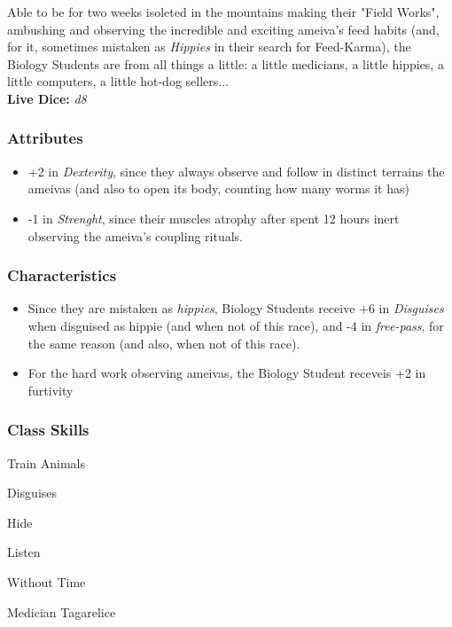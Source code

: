 \documentclass[ letterpaper,12pt]{article}
\begin{document}
Able to be for two weeks isoleted in the mountains making their "Field Works",
ambushing and observing the incredible and exciting ameiva's feed habits (and,
for it, sometimes mistaken as {\it Hippies} in their search for Feed-Karma),
the Biology Students are from all things a little: a little medicians, a little
hippies, a little computers, a little hot-dog sellers...\\

{\bf Live Dice:} {\it d8}

\subsubsection{Attributes}
\begin{itemize}
\item{+2 in {\it Dexterity}, since they always observe and follow in distinct terrains the ameivas (and also to open its body, counting how many worms it has)}
\item{-1 in {\it Strenght}, since their muscles atrophy after spent 12 hours inert observing the ameiva's coupling rituals.}
\end{itemize}

\subsubsection{Characteristics}
\begin{itemize}
\item{Since they are mistaken as {\it hippies}, Biology Students receive +6 in {\it Disguises} when disguised as hippie (and when not of this race), and -4 in {\it free-pass}, for the same reason (and also, when not of this race).}
\item{For the hard work observing ameivas, the Biology Student receveis +2 in {furtivity}}
\end{itemize}

\subsubsection{Class Skills}
\begin{itemize}
{\it 
\item{Train Animals}
\item{Disguises}
\item{Hide}
\item{Listen}
\item{Without Time}
\item{Medician Tagarelice}
}
\end{itemize}
\end{document}

